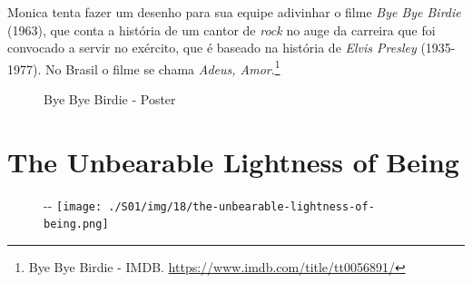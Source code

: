 \saveparinfos
\noindent
\begin{minipage}[c]{0.5\textwidth}\useparinfo

Monica tenta fazer um desenho para sua equipe adivinhar o filme
\emph{Bye Bye Birdie} (1963), que conta a história de um cantor de
\emph{rock} no auge da carreira que foi convocado a servir no exército,
que é baseado na história de \emph{Elvis Presley} (1935-1977). No Brasil
o filme se chama \emph{Adeus, Amor}.\footnote{\sloppy Bye Bye Birdie - IMDB. \url{https://www.imdb.com/title/tt0056891/}}

\end{minipage}\hfill
\begin{minipage}[c]{0.5\textwidth}

\begin{figure}
  \centering
    \caption{Bye Bye Birdie - Poster\label{fig:bye-bye-birdie-poster}}
\end{figure}

\end{minipage}

\hypertarget{the-unbearable-lightness-of-being}{%
\section{The Unbearable Lightness of
Being}\label{the-unbearable-lightness-of-being}}

\begin{figure}[!ht]
  \begin{adjustwidth}{-\oddsidemargin-1in}{-\rightmargin}
    \centering
    \texttt{[image: ./S01/img/18/the-unbearable-lightness-of-being.png]}
  \end{adjustwidth}
\end{figure}

